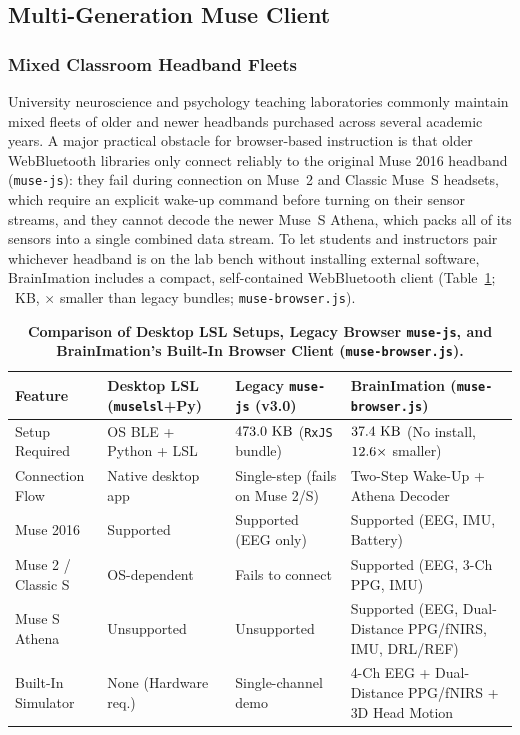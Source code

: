 \documentclass[11pt]{article}
\begin{document}
\subsection{Multi-Generation Muse Client}

\subsubsection{Mixed Classroom Headband Fleets}
University neuroscience and psychology teaching laboratories commonly maintain mixed fleets of older and newer headbands purchased across several academic years. A major practical obstacle for browser-based instruction is that older WebBluetooth libraries only connect reliably to the original Muse 2016 headband (\texttt{muse-js}): they fail during connection on Muse~2 and Classic Muse~S headsets, which require an explicit wake-up command before turning on their sensor streams, and they cannot decode the newer Muse~S Athena, which packs all of its sensors into a single combined data stream. To let students and instructors pair whichever headband is on the lab bench without installing external software, BrainImation includes a compact, self-contained WebBluetooth client (Table~\ref{tab:gatt}; \MuseBrowserKB~KB, \BundleReductionFactor$\times$ smaller than legacy bundles; \texttt{muse-browser.js}).

\begin{table}[t!]
\centering
\caption{\textbf{Comparison of Desktop LSL Setups, Legacy Browser \texttt{muse-js}, and BrainImation's Built-In Browser Client (\texttt{muse-browser.js}).}}
\label{tab:gatt}
\footnotesize
\setlength{\tabcolsep}{5pt}
\begin{tabular}{p{}p{}p{}p{}}
\toprule
\textbf{Feature} & \textbf{Desktop LSL (\texttt{muselsl}+Py)} & \textbf{Legacy \texttt{muse-js} (v3.0)} & \textbf{BrainImation (\texttt{muse-browser.js})} \\
\midrule
Setup Required & OS BLE + Python + LSL & $473.0\text{ KB}$ (\texttt{RxJS} bundle) & $37.4\text{ KB}$ (No install, $12.6\times$ smaller) \\
Connection Flow & Native desktop app & Single-step (fails on Muse 2/S) & Two-Step Wake-Up + Athena Decoder \\
Muse 2016 & Supported & Supported (EEG only) & Supported (EEG, IMU, Battery) \\
Muse 2 / Classic S & OS-dependent & Fails to connect & Supported (EEG, 3-Ch PPG, IMU) \\
Muse S Athena & Unsupported & Unsupported & Supported (EEG, Dual-Distance PPG/fNIRS, IMU, DRL/REF) \\
Built-In Simulator & None (Hardware req.) & Single-channel demo & 4-Ch EEG + Dual-Distance PPG/fNIRS + 3D Head Motion \\
\bottomrule
\end{tabular}
\end{table}
\end{document}
